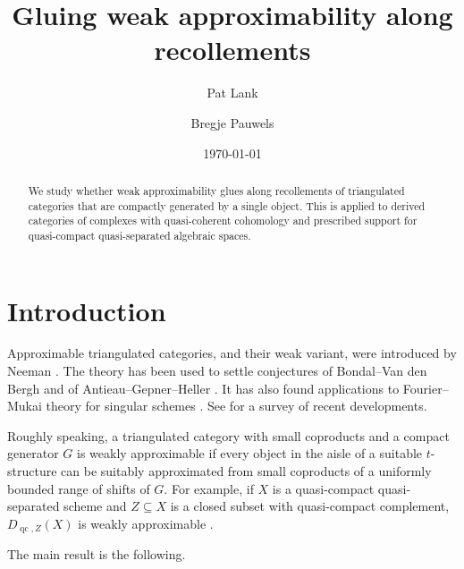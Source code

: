 \documentclass[11pt]{amsart}
\title[Gluing weak approximability along recollements]{Gluing weak approximability along recollements}
\author[P.~Lank]{Pat Lank}
\author[B. ~Pauwels]{Bregje Pauwels}
\date{\today}
\theoremstyle{plain}
\theoremstyle{definition}
\numberwithin{equation}{section}
\numberwithin{theorem}{section}
\begin{document}
\begin{abstract}
    We study whether weak approximability glues along recollements of triangulated categories that are compactly generated by a single object.
    This is applied to derived categories of complexes with quasi-coherent cohomology and prescribed support for quasi-compact quasi-separated algebraic spaces.
\end{abstract}

\maketitle

\tableofcontents

\section{Introduction}
\label{sec:intro}

Approximable triangulated categories, and their weak variant, were introduced by Neeman \cite{Neeman:2021c,Neeman:2021,Neeman:2026}.
The theory has been used to settle conjectures of Bondal--Van den Bergh \cite{Neeman:2021} and of Antieau--Gepner--Heller \cite{Neeman:2024}.
It has also found applications to Fourier--Mukai theory for singular schemes  \cite{Dutta/Lank/ManaliRahul:2025,GuisadoVillaalgordo/Lank/ManaliRahul/Pavic:2025,GuisadoVillaalgordo/Lank:2026}.
See \cite{Canonaco/Neeman/Stellari:2024} for a survey of recent developments.

Roughly speaking, a triangulated category with small coproducts and a compact generator $G$ is weakly approximable if every object in the aisle of a suitable $t$-structure can be suitably approximated from small coproducts of a uniformly bounded range of shifts of $G$.
For example, if $X$ is a quasi-compact quasi-separated scheme and $Z\subseteq X$ is a closed subset with quasi-compact complement, $D_{\operatorname{qc},Z}(X)$ is weakly approximable \cite[Theorem 3.2(iv)]{Neeman:2024}.

The main result is the following. 
\end{document}
